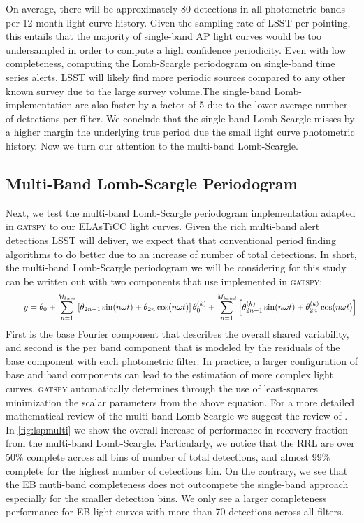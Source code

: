 \documentclass[DM,authoryear,toc]{lsstdoc}
\begin{document}
On average, there will be approximately 80 detections in all photometric bands per 12 month light curve history. Given the sampling rate of LSST per pointing, this entails that the majority of single-band AP light curves would be too undersampled in order to compute a high confidence periodicity. Even with low completeness, computing the Lomb-Scargle periodogram on single-band time series alerts, LSST will likely find more periodic sources compared to any other known survey due to the large survey volume.The single-band Lomb-implementation are also faster by a factor of 5 due to the lower average number of detections per filter.
We conclude that the single-band Lomb-Scargle misses by a higher margin the underlying true period due the small light curve photometric history. Now we turn our attention to the multi-band Lomb-Scargle.

\subsection{Multi-Band Lomb-Scargle Periodogram}
Next, we test the multi-band Lomb-Scargle periodogram implementation adapted in \textsc{gatspy} to our ELAsTiCC light curves.
Given the rich multi-band alert detections LSST will deliver, we expect that that conventional period finding algorithms to do better due to an increase of number of total detections.
In short, the multi-band Lomb-Scargle periodogram we will be considering for this study can be written out with two components that use implemented in \textsc{gatspy}:
\smallbreak{}
\begin{equation}
\qquad y = \theta_0+\sum_{n=1}^{M_{base}}\left[\theta_{2 n-1} \sin (n \omega t)+\theta_{2 n} \cos (n \omega t)\right] \\
\theta_0^{(k)}+\sum_{n=1}^{M _{band}}\left[\theta_{2 n-1}^{(k)} \sin (n \omega t)+\theta_{2 n}^{(k)} \cos (n \omega t)\right]
\end{equation}
\smallbreak{}
First is the base Fourier component that describes the overall shared variability, and second is the per band component that is modeled by the residuals of the base component with each photometric filter.
In practice, a larger configuration of base and band components can lead to the estimation of more complex light curves. \textsc{gatspy} automatically determines through the use of least-squares minimization the scalar parameters from the above equation. For a more detailed mathematical review of the multi-band Lomb-Scargle we suggest the review of \citet{VanderPlas:VP2015}. In \ref{fig:lspmulti} we show the overall increase of performance in recovery fraction from the multi-band Lomb-Scargle. Particularly, we notice that the RRL are over 50$\%$ complete across all bins of number of total detections, and almost 99$\%$ complete for the highest number of detections bin. On the contrary, we see that the EB mutli-band completeness does not outcompete the single-band approach especially for the smaller detection bins. We only see a larger completeness performance for EB light curves with more than 70 detections across all filters.
\end{document}

